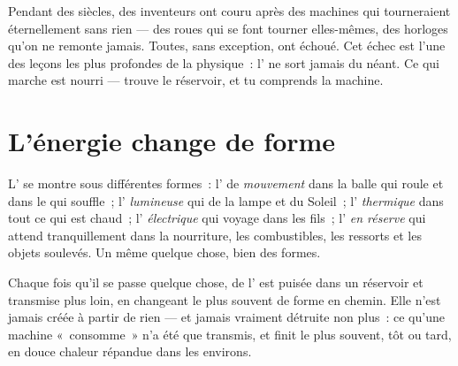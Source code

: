 \begin{remark}\label{rem:g5:everyday-energy:nofree}
Pendant des siècles, des inventeurs ont couru après des machines qui
tourneraient éternellement sans rien --- des roues qui se font
tourner elles-mêmes, des horloges qu'on ne remonte jamais. Toutes,
sans exception, ont échoué. Cet échec est l'une des leçons les plus
profondes de la physique~: l' ne sort jamais du néant. Ce qui
marche est nourri --- trouve le réservoir, et tu comprends la
machine.
\end{remark}

\section{L'énergie change de forme}

\begin{example}\label{ex:g5:everyday-energy:forms}
L' se montre sous différentes formes~: l' de
\emph{mouvement} dans la balle qui roule et dans le  qui
souffle~; l' \emph{lumineuse} qui  de la lampe et du
Soleil~; l' \emph{thermique} dans tout ce qui est chaud~;
l' \emph{électrique} qui voyage dans les fils~; l'
\emph{en réserve} qui attend tranquillement dans la nourriture, les
combustibles, les ressorts et les objets soulevés. Un même quelque
chose, bien des formes.
\end{example}

\begin{proposition}\label{prop:g5:everyday-energy:chain}
Chaque fois qu'il se passe quelque chose, de l' est puisée
dans un réservoir et transmise plus loin, en changeant le plus
souvent de forme en chemin. Elle n'est jamais créée à partir de
rien --- et jamais vraiment détruite non plus~: ce qu'une machine
«~consomme~» n'a été que transmis, et finit le plus souvent, tôt ou
tard, en douce chaleur répandue dans les environs.
\end{proposition}


